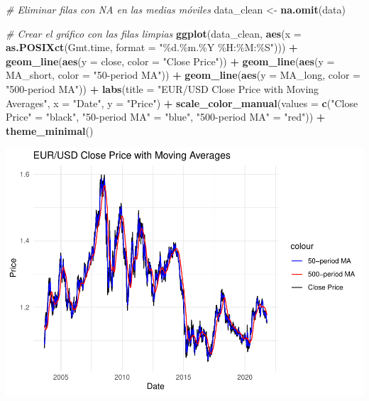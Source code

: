 \documentclass[
]{book}
\newenvironment{Shaded}{\begin{snugshade}}{\end{snugshade}}
\newcommand{\AttributeTok}[1]{\textcolor[rgb]{0.13,0.29,0.53}{#1}}
\newcommand{\CommentTok}[1]{\textcolor[rgb]{0.56,0.35,0.01}{\textit{#1}}}
\newcommand{\FunctionTok}[1]{\textcolor[rgb]{0.13,0.29,0.53}{\textbf{#1}}}
\newcommand{\NormalTok}[1]{#1}
\newcommand{\OtherTok}[1]{\textcolor[rgb]{0.56,0.35,0.01}{#1}}
\newcommand{\SpecialCharTok}[1]{\textcolor[rgb]{0.81,0.36,0.00}{\textbf{#1}}}
\newcommand{\StringTok}[1]{\textcolor[rgb]{0.31,0.60,0.02}{#1}}
\begin{document}
\begin{Shaded}
\begin{Highlighting}[]
\CommentTok{\# Eliminar filas con NA en las medias móviles}
\NormalTok{data\_clean }\OtherTok{\textless{}{-}} \FunctionTok{na.omit}\NormalTok{(data)}

\CommentTok{\# Crear el gráfico con las filas limpias}
\FunctionTok{ggplot}\NormalTok{(data\_clean, }\FunctionTok{aes}\NormalTok{(}\AttributeTok{x =} \FunctionTok{as.POSIXct}\NormalTok{(Gmt.time, }\AttributeTok{format =} \StringTok{"\%d.\%m.\%Y \%H:\%M:\%S"}\NormalTok{))) }\SpecialCharTok{+}
  \FunctionTok{geom\_line}\NormalTok{(}\FunctionTok{aes}\NormalTok{(}\AttributeTok{y =}\NormalTok{ close, }\AttributeTok{color =} \StringTok{"Close Price"}\NormalTok{)) }\SpecialCharTok{+}
  \FunctionTok{geom\_line}\NormalTok{(}\FunctionTok{aes}\NormalTok{(}\AttributeTok{y =}\NormalTok{ MA\_short, }\AttributeTok{color =} \StringTok{"50{-}period MA"}\NormalTok{)) }\SpecialCharTok{+}
  \FunctionTok{geom\_line}\NormalTok{(}\FunctionTok{aes}\NormalTok{(}\AttributeTok{y =}\NormalTok{ MA\_long, }\AttributeTok{color =} \StringTok{"500{-}period MA"}\NormalTok{)) }\SpecialCharTok{+}
  \FunctionTok{labs}\NormalTok{(}\AttributeTok{title =} \StringTok{"EUR/USD Close Price with Moving Averages"}\NormalTok{,}
       \AttributeTok{x =} \StringTok{"Date"}\NormalTok{, }\AttributeTok{y =} \StringTok{"Price"}\NormalTok{) }\SpecialCharTok{+}
  \FunctionTok{scale\_color\_manual}\NormalTok{(}\AttributeTok{values =} \FunctionTok{c}\NormalTok{(}\StringTok{"Close Price"} \OtherTok{=} \StringTok{"black"}\NormalTok{, }
                                \StringTok{"50{-}period MA"} \OtherTok{=} \StringTok{"blue"}\NormalTok{, }
                                \StringTok{"500{-}period MA"} \OtherTok{=} \StringTok{"red"}\NormalTok{)) }\SpecialCharTok{+}
  \FunctionTok{theme\_minimal}\NormalTok{()}
\end{Highlighting}
\end{Shaded}

\includegraphics{bookdown_time_series_files/figure-latex/unnamed-chunk-3-1.pdf}
\end{document}
